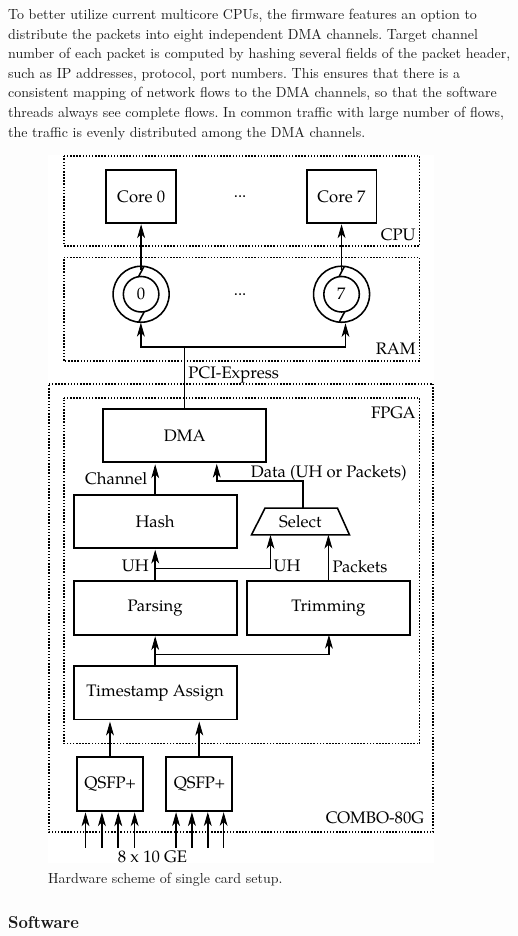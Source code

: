 To better utilize current multicore CPUs, the firmware features an option to distribute the packets into eight independent DMA channels. Target channel number of each packet is computed by hashing several fields of the packet header, such as IP addresses, protocol, port numbers. This ensures that there is a consistent mapping of network flows to the DMA channels, so that the software threads always see complete flows. In common traffic with large number of flows, the traffic is evenly distributed among the DMA channels.

\begin{figure}[t]
    \centering 
    \includegraphics{figures/paper-highdensity/fig/hw}
    \caption{Hardware scheme of single card setup.}
    \label{fig:hw}
\end{figure}

\subsubsection{Software}

